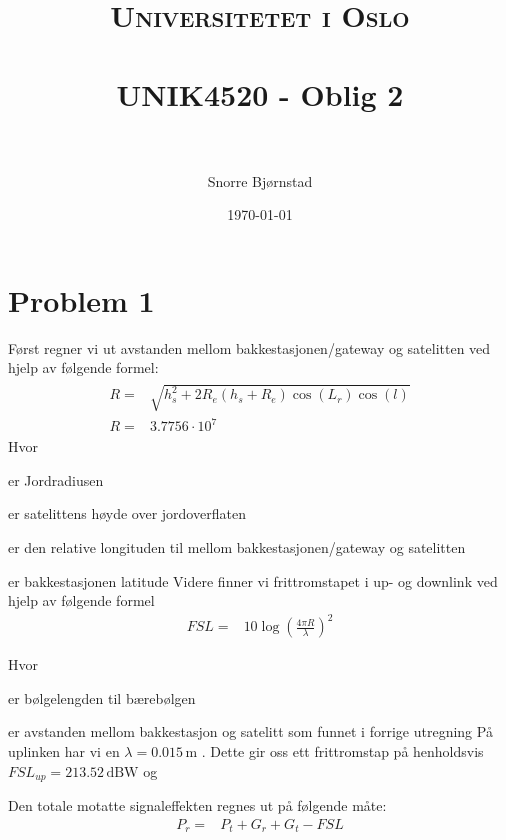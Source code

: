 \documentclass[norsk,a4paper,12pt]{article}
\title{	
\normalfont \normalsize 
\textsc{Universitetet i Oslo} \\ [25pt] %
\horrule{0.5pt} \\[0.4cm] %
\huge UNIK4520 - Oblig 2\\ %
\horrule{2pt} \\[0.5cm] %
}
\author{Snorre Bjørnstad} %
\date{\normalsize\today} %
\newenvironment{descr}[1]{\list{}{%
  \setlength{\topsep}{0pt}
  \setlength{\itemsep}{0pt}
  \setlength{\parsep}{0pt}
  \setlength{\itemindent}{0pt}
  \settowidth{\labelwidth}{#1}
  \setlength{\labelsep}{2ex}
  \setlength{\leftmargin}{\parindent}
  \addtolength{\leftmargin}{\labelwidth}
  \addtolength{\leftmargin}{\labelsep}
  }}
  {\endlist}
\newcommand{\idesc}[1]{\item[#1\hspace*{\fill}]}
\numberwithin{equation}{section} %
\numberwithin{figure}{section} %
\numberwithin{table}{section} %
\newcommand{\e}[1]{\cdot 10^{#1}}
\newcommand{\unit}[1]{\ensuremath{\, \mathrm{#1}}}
\begin{document}
  
\maketitle %


\section{Problem 1}

Først regner vi ut avstanden mellom bakkestasjonen/gateway og satelitten ved hjelp av følgende formel:
\begin{align}
\begin{split}
R =& \sqrt{h_s^2 + 2R_e(h_s+R_e)\cos(L_r)\cos(l)}\\
R =&  3.7756\e{7}
\end{split}
\end{align}
Hvor \par
\begin{descr}{$h_s = 3.5786\e{7}$}
  \idesc{$R_e = 6.371\e{6}$} er Jordradiusen
  \idesc{$h_s = 3.5786\e{7}$} er satelittens høyde over jordoverflaten
  \idesc{$L_r = 3^\circ$} er den relative longituden til mellom bakkestasjonen/gateway og satelitten
  \idesc{$l = 43^\circ$} er bakkestasjonen latitude
\end{descr}
\newpage
Videre finner vi  frittromstapet i up- og downlink ved hjelp av følgende formel
\begin{align}
FSL = & 10\log \left(\frac{4\pi R}{\lambda} \right)^2
\end{align}

Hvor \par
\begin{descr}{$h_s = 3.5786\e{7}$}
  \idesc{$\lambda$} er bølgelengden til bærebølgen
  \idesc{$R$} er avstanden mellom bakkestasjon og satelitt som funnet i forrige utregning
\end{descr}
På uplinken har vi  en $\lambda = 0.015\unit{m}$ .
Dette gir oss ett frittromstap på henholdsvis $FSL_{up} = 213.52\unit{dBW}$ og 

\par
Den totale motatte signaleffekten regnes ut på følgende måte:
\begin{align}
P_r =&  P_t + G_r + G_t - FSL
\end{align}
\end{document}
